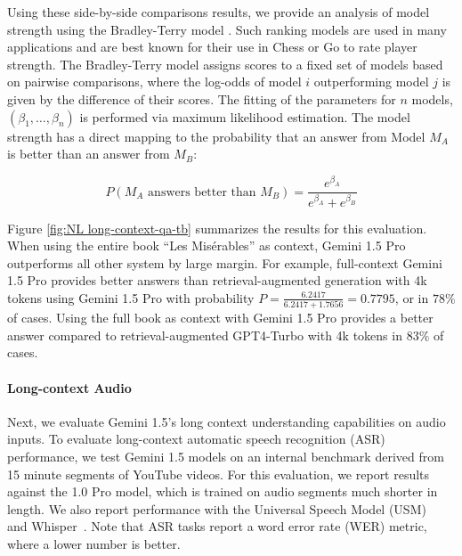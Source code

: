 Using these side-by-side comparisons results, we provide an analysis of model strength using the Bradley-Terry model \citep{BradleyTerry}. Such ranking models are used in many applications and are best known for their use in Chess or Go to rate player strength. The Bradley-Terry model assigns scores to a fixed set of models based on pairwise comparisons, where the log-odds of model $i$ outperforming model $j$ is given by  the difference of their scores. The fitting of the parameters for $n$ models, $(\beta_1, \ldots, \beta_n)$ is performed via maximum likelihood estimation. The model strength has a direct mapping to the probability that an answer from Model $M_A$ is better than an answer from $M_B$:

\begin{equation}
P(M_A \text{ answers better than } M_B) = \frac{e^{\beta_A}}{e^{\beta_A} + e^{\beta_B}}
\end{equation}

Figure \ref{fig:NL long-context-qa-tb} summarizes the results for this evaluation. When using the entire book ``Les Misérables'' as context, Gemini 1.5 Pro outperforms all other system by large margin. For example, full-context Gemini 1.5 Pro provides better answers than retrieval-augmented generation with  4k tokens using Gemini 1.5 Pro with probability $P=\frac{6.2417}{6.2417 + 1.7656} = 0.7795$, or in $78\%$ of cases. Using the full book as context with Gemini 1.5 Pro provides a better answer compared to retrieval-augmented GPT4-Turbo with 4k tokens in $83\%$ of cases.       

\paragraph{Long-context Audio}

Next, we evaluate Gemini 1.5's long context understanding capabilities on audio inputs. To evaluate long-context automatic speech recognition (ASR) performance, we test Gemini 1.5 models on an internal benchmark derived from 15 minute segments of YouTube videos. For this evaluation, we report results against the 1.0 Pro model, which is trained on audio segments much shorter in length.  We also report performance with the Universal Speech Model (USM)~\cite{usm} and Whisper~\cite{whisper-v3}. Note that ASR tasks report a word error rate (WER) metric, where a lower number is better. 

